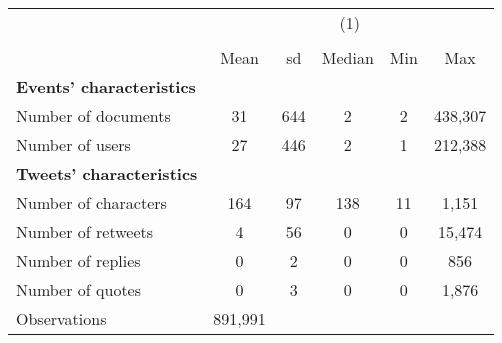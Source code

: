 {
\def\sym#1{\ifmmode^{#1}\else\(^{#1}\)\fi}
\begin{tabular}{l*{1}{ccccc}}
\hline\hline
                    &\multicolumn{5}{c}{(1)}                                         \\
                    &\multicolumn{5}{c}{}                                            \\
                    &        Mean&          sd&      Median&         Min&         Max\\
\hline
\textbf{Events' characteristics}&            &            &            &            &            \\
Number of documents &          31&         644&           2&           2&     438,307\\
Number of users     &          27&         446&           2&           1&     212,388\\
\textbf{Tweets' characteristics}&            &            &            &            &            \\
Number of characters&         164&          97&         138&          11&       1,151\\
Number of retweets  &           4&          56&           0&           0&      15,474\\
Number of replies   &           0&           2&           0&           0&         856\\
Number of quotes    &           0&           3&           0&           0&       1,876\\
\hline
Observations        &     891,991&            &            &            &            \\
\hline\hline
\end{tabular}
}
